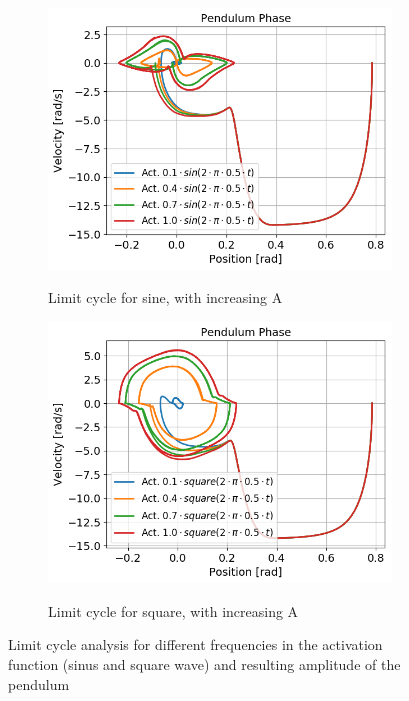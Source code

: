 \documentclass{cmc}
\begin{document}
\begin{figure}[H]
  \hspace{1pt}
    \begin{subfigure}[b]{0.49\textwidth}
    { \centering
      \includegraphics[width=\textwidth]{figures/2c_LimitCycle_Amplitude_sin.png} }
    \caption{Limit cycle for sine, with increasing A}
    \label{fig:Exercise2cLimitCycleSinAmplitude}
  \end{subfigure}
\begin{subfigure}[b]{0.49\textwidth}
    { \centering
      \includegraphics[width=\textwidth]{figures/2c_LimitCycle_Amplitude_square.png} }
    \caption{Limit cycle for square, with increasing A}
    \label{fig:Exercise2cLimitCycleSquareAmplitude}
  \end{subfigure}
  \caption{Limit cycle analysis for different frequencies in the activation function (sinus and square wave) and resulting amplitude of the pendulum}
  \label{fig:Exercise2c}
\end{figure}
\end{document}
